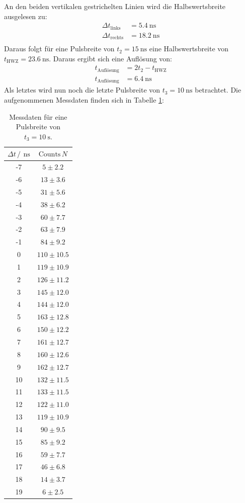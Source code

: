 \FloatBarrier
\noindent An den beiden vertikalen gestrichelten Linien wird die Halbswertsbreite ausgelesen zu:
\begin{align*}
	\Delta t_\mathrm{links}&=\SI{5.4}{\nano\second} \\
	\Delta t_\mathrm{rechts}&=\SI{18.2}{\nano\second} \\
\end{align*}
Daraus folgt für eine Pulsbreite von $t_\mathrm{2}=\SI{15}{\nano\second}$ eine Halbswertsbreite von $t_\mathrm{HWZ}=\SI{23.6}{\nano\second}$. Daraus ergibt sich eine Auflösung von:
\begin{align*}
	t_\mathrm{Auflösung}&=2 t_\mathrm{2}-t_\mathrm{HWZ} \\
	t_\mathrm{Auflösung}&=\SI{6.4}{\nano\second}
\end{align*}
Als letztes wird nun noch die letzte Pulsbreite von $t_\mathrm{3}=\SI{10}{\nano\second}$ betrachtet. Die aufgenommenen Messdaten finden sich in Tabelle \ref{tab:tab3}:
\begin{table}
  \centering
  \caption{Messdaten für eine Pulsbreite von $t_\mathrm{3}=\SI{10}{\second}$.}
  \label{tab:tab3}
  \begin{tabular}{c c}
    \toprule
		$\Delta t\, / \, \SI{}{\nano\second}$ & $\mathrm{Counts} \, N$ \\
    \midrule
    -7 & $5\pm2.2$ \\
		-6 & $13\pm3.6$ \\
		-5 & $31\pm5.6$ \\
		-4 & $38\pm6.2$ \\
		-3 & $60\pm7.7$ \\
		-2 & $63\pm7.9$ \\
		-1 & $84\pm9.2$ \\
		0 & $110\pm10.5$ \\
		1 & $119\pm10.9$ \\
		2 & $126\pm11.2$ \\
		3 & $145\pm12.0$ \\
		4 & $144\pm12.0$ \\
		5 & $163\pm12.8$ \\
		6 & $150\pm12.2$ \\
		7 & $161\pm12.7$ \\
		8 & $160\pm12.6$ \\
		9 & $162\pm12.7$ \\
		10 & $132\pm11.5$ \\
		11 & $133\pm11.5$ \\
		12 & $122\pm11.0$ \\
		13 & $119\pm10.9$ \\
		14 & $90\pm9.5$ \\
		15 & $85\pm9.2$ \\
		16 & $59\pm7.7$ \\
		17 & $46\pm6.8$ \\
		18 & $14\pm3.7$ \\
		19 & $6\pm2.5$ \\
    \bottomrule
  \end{tabular}
\end{table}
